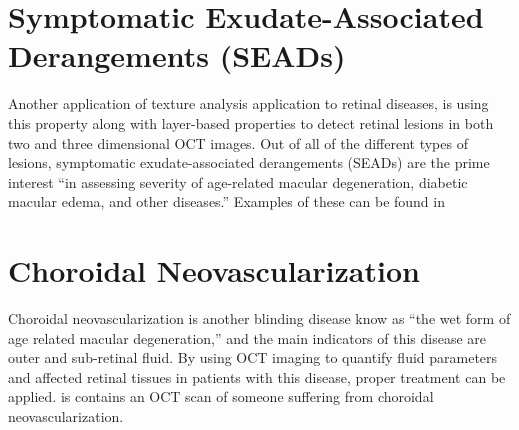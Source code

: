 
\section{Symptomatic Exudate-Associated Derangements (SEADs)}
Another application of texture analysis application to retinal diseases, is using this property along with layer-based properties to detect retinal lesions in both two and three dimensional OCT images. Out of all of the different types of lesions, symptomatic exudate-associated derangements (SEADs) are the prime interest “in assessing severity of age-related macular degeneration, diabetic macular edema, and other diseases.” \cite{}  Examples of these can be found in 


\section{Choroidal Neovascularization}
Choroidal neovascularization is another blinding disease know as “the wet form of age related macular degeneration,” \cite{} and the main indicators of this disease are outer and sub-retinal fluid. \cite{}  By using OCT imaging to quantify fluid parameters and affected retinal tissues in patients with this disease, proper treatment can be applied.  \cite{}  is contains an OCT scan of someone suffering from choroidal neovascularization. 

